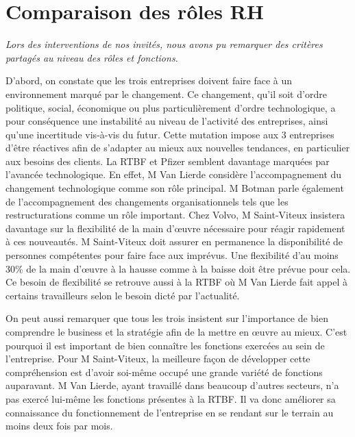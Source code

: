 \documentclass[a4paper, 12pt]{article}
\begin{document}
\section{Comparaison des rôles RH}

\textit{Lors des interventions de nos invités, nous avons pu remarquer des critères  partagés au niveau des rôles et  fonctions.}

D'abord, on constate que les trois entreprises doivent faire face à un environnement marqué par le changement. Ce changement, qu'il soit d'ordre politique, social, économique ou plus particulièrement d'ordre technologique, a pour conséquence une instabilité au niveau de l'activité des entreprises, ainsi qu'une incertitude vis-à-vis du futur. Cette mutation  impose aux 3 entreprises d'être réactives afin de s'adapter au mieux aux nouvelles tendances, en particulier aux besoins des clients. La RTBF et Pfizer semblent davantage marquées par l'avancée technologique. En effet, M Van Lierde considère l'accompagnement du changement technologique comme son rôle principal. M Botman parle également de l'accompagnement des changements organisationnels tels que les restructurations comme un rôle important. Chez Volvo, M Saint-Viteux insistera davantage sur la flexibilité de la main d'œuvre nécessaire pour réagir rapidement à ces nouveautés. M Saint-Viteux doit assurer en permanence la disponibilité de personnes compétentes pour faire face aux imprévus. Une flexibilité d'au moins 30\% de la main d'œuvre à la hausse comme à la baisse doit être prévue pour cela. Ce besoin de flexibilité se retrouve aussi à la RTBF où M Van Lierde fait appel à certains travailleurs selon le besoin dicté par l'actualité. 

On peut aussi remarquer que tous les trois insistent sur l'importance de bien comprendre le business et la stratégie afin de la mettre en œuvre au mieux. C'est pourquoi il est important de bien connaître les fonctions exercées au sein de l'entreprise. Pour M Saint-Viteux, la meilleure façon de développer cette compréhension est d'avoir soi-même occupé une grande variété de fonctions auparavant. M Van Lierde, ayant travaillé dans beaucoup d'autres secteurs, n'a pas exercé lui-même les fonctions présentes à la RTBF. Il va donc améliorer sa connaissance du fonctionnement de l'entreprise en se rendant sur le terrain au moins deux fois par mois.
\end{document}
